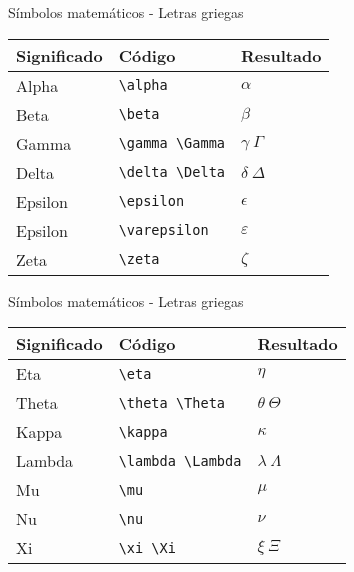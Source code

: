 \documentclass[
  ignorenonframetext,
]{beamer}
\begin{document}
\begin{frame}[fragile]{Símbolos matemáticos - Letras griegas}
\protect\hypertarget{suxedmbolos-matemuxe1ticos---letras-griegas}{}
\begin{longtable}[]{@{}lll@{}}
\toprule
Significado & Código & Resultado \\
\midrule
\endhead
Alpha & \texttt{\textbackslash{}alpha} & \(\alpha\) \\
Beta & \texttt{\textbackslash{}beta} & \(\beta\) \\
Gamma & \texttt{\textbackslash{}gamma\ \textbackslash{}Gamma} &
\(\gamma\  \Gamma\) \\
Delta & \texttt{\textbackslash{}delta\ \textbackslash{}Delta} &
\(\delta\  \Delta\) \\
Epsilon & \texttt{\textbackslash{}epsilon} & \(\epsilon\) \\
Epsilon & \texttt{\textbackslash{}varepsilon} & \(\varepsilon\) \\
Zeta & \texttt{\textbackslash{}zeta} & \(\zeta\) \\
\bottomrule
\end{longtable}
\end{frame}

\begin{frame}[fragile]{Símbolos matemáticos - Letras griegas}
\protect\hypertarget{suxedmbolos-matemuxe1ticos---letras-griegas-1}{}
\begin{longtable}[]{@{}lll@{}}
\toprule
Significado & Código & Resultado \\
\midrule
\endhead
Eta & \texttt{\textbackslash{}eta} & \(\eta\) \\
Theta & \texttt{\textbackslash{}theta\ \textbackslash{}Theta} &
\(\theta\ \Theta\) \\
Kappa & \texttt{\textbackslash{}kappa} & \(\kappa\) \\
Lambda & \texttt{\textbackslash{}lambda\ \textbackslash{}Lambda} &
\(\lambda\  \Lambda\) \\
Mu & \texttt{\textbackslash{}mu} & \(\mu\) \\
Nu & \texttt{\textbackslash{}nu} & \(\nu\) \\
Xi & \texttt{\textbackslash{}xi\ \textbackslash{}Xi} & \(\xi\ \Xi\) \\
\bottomrule
\end{longtable}
\end{frame}
\end{document}
